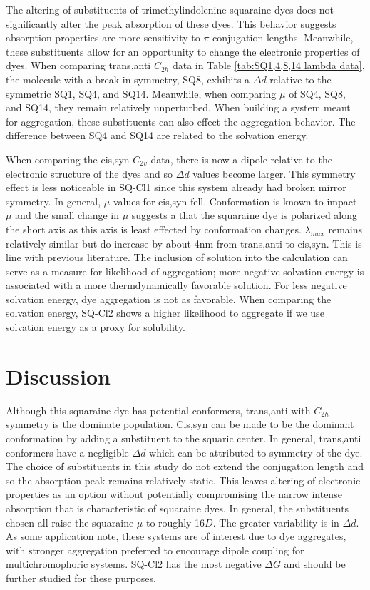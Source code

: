 \documentclass[journal=jacsat,manuscript=article]{achemso}
\begin{document}
\newpage
The altering of substituents of trimethylindolenine squaraine dyes does not significantly alter the peak absorption of these dyes. This behavior suggests absorption properties are more sensitivity to $\pi$ conjugation lengths\cite{Yamaguchi2008HowEfficiency}.  Meanwhile, these substituents allow for an opportunity to change the electronic properties of dyes. When comparing trans,anti $C_{2h}$ data in Table \ref{tab:SQ1,4,8,14 lambda data}, the molecule with a break in symmetry, SQ8, exhibits a $\Delta d$ relative to the symmetric SQ1, SQ4, and SQ14. Meanwhile, when comparing $\mu$ of SQ4, SQ8, and SQ14, they remain relatively unperturbed. 
When building a system meant for aggregation, these substituents can also effect the aggregation behavior. The difference between SQ4 and SQ14 are related to the solvation energy.

When comparing the cis,syn $C_{2v}$ data, there is now a dipole relative to the electronic structure of the dyes and so $\Delta d$ values become larger. This symmetry effect is less noticeable in SQ-Cl1 since this system already had broken mirror symmetry. In general, $\mu$ values for cis,syn fell. Conformation is known to impact $\mu$\cite{Brand2011HowStructure} and the small change in $\mu$ suggests a that the squaraine dye is polarized along the short axis as this axis is least effected by conformation changes\cite{Lopata2011Excited-stateTD-ZINDO}. $\lambda_{max}$ remains relatively similar but do increase by about 4nm from trans,anti to cis,syn. This is line with previous literature\cite{Borrelli2014TheoreticalDye}.
The inclusion of solution into the calculation can serve as a measure for likelihood of aggregation; more negative solvation energy is associated with a more thermdynamically favorable solution. For less negative solvation energy, dye aggregation is not as favorable. When comparing the solvation energy, SQ-Cl2 shows a higher likelihood to aggregate if we use solvation energy as a proxy for solubility\cite{Fothergill2018AbDyes}. 
\newpage
\newpage
\section{Discussion}

Although this squaraine dye has potential conformers, trans,anti with $C_{2h}$ symmetry is the dominate population. Cis,syn can be made to be the dominant conformation by adding a substituent to the squaric center. In general, trans,anti conformers have a negligible $\Delta d$ which can be attributed to symmetry of the dye.
The choice of substituents in this study do not extend the conjugation length and so the absorption peak remains relatively static. This leaves altering of electronic properties as an option without potentially compromising the narrow intense absorption that is characteristic of squaraine dyes.
In general, the substituents chosen all raise the squaraine $\mu$ to roughly 16$D$. The greater variability is in $\Delta d$.
As some application note, these systems are of interest due to dye aggregates, with stronger aggregation preferred to encourage dipole coupling for multichromophoric systems. SQ-Cl2 has the most negative $\Delta G$ and should be further studied for these purposes.
\end{document}
